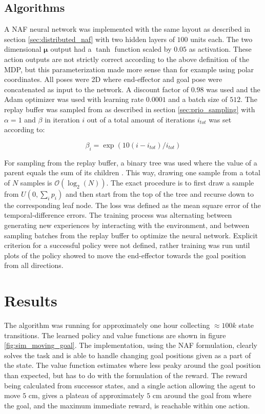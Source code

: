 \subsection{Algorithms}

A NAF neural network was implemented with the same layout as described in
section \ref{sec:distributed_naf} with two hidden layers of $100$ units each.
The two dimensional $\mathbf{\mu}$ output had a $\tanh$ function scaled by
$0.05$ as activation. These  action outputs are not strictly correct according
to the above definition of the MDP, but this parameterization made more sense
than for example using polar coordinates. All poses were 2D where end-effector
and goal pose were concatenated as input to the network. A discount factor of
$0.98$ was used and the Adam optimizer \cite{kingma2014adam} was used with
learning rate $0.0001$ and a batch size of $512$. The replay buffer was sampled
from as described in section \ref{sec:prio_sampling} with $\alpha = 1$ and
$\beta$ in iteration $i$ out of a total amount of iterations $i_{tot}$ was set
according to:

\begin{equation}
    \beta_i = \exp \left( 10(i - i_{tot}) / i_{tot}\right)
\end{equation}

For sampling from the replay buffer, a binary tree was used where the value of
a parent equals the sum of its children \cite{schaul2015prioritized}. This way,
drawing one sample from a total of $N$ samples is $\mathcal{O}(\log_2(N))$. The
exact procedure is to first draw a sample from $U(0, \sum_i p_i)$ and then
start from the top of the tree and recurse down to the corresponding leaf node.
The loss was defined as the mean square error of the temporal-difference
errors. The training process was alternating between generating new experiences
by interacting with the environment, and between sampling batches from the
replay buffer to optimize the neural network. Explicit criterion for a
successful policy were not defined, rather training was run until plots of the
policy showed to move the end-effector towards the goal position from all
directions.

\section{Results}

The algorithm was running for approximately one hour collecting $\approx 100k$
state transitions. The learned policy and value functions are shown in figure
\ref{fig:sim_moving_goal}. The implementation, using the NAF formulation,
clearly solves the task and is able to handle changing goal positions given as
a part of the state. The value function estimates where less peaky around the
goal position than expected, but has to do with the formulation of the reward.
The reward being calculated from successor states, and a single action allowing
the agent to move $5$ cm, gives a plateau of approximately $5$ cm around the
goal from where the goal, and the maximum immediate reward, is reachable within
one action.

